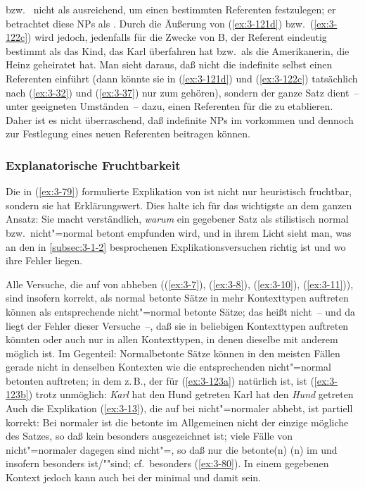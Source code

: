 \documentclass[output=paper]{langsci/langscibook}
\begin{document}
bzw.\  nicht als ausreichend, um einen
bestimmten Referenten festzulegen; er betrachtet diese NPs als
. Durch die Äußerung von (\ref{ex:3-121d}) bzw.\ (\ref{ex:3-122c}) wird jedoch, jedenfalls für die Zwecke von B, der Referent eindeutig bestimmt als das Kind, das Karl überfahren hat bzw.\ als die Amerikanerin, die Heinz geheiratet hat. Man sieht daraus, daß nicht
die indefinite  selbst einen Referenten einführt (dann könnte sie in (\ref{ex:3-121d}) und (\ref{ex:3-122c}) tatsächlich nach (\ref{ex:3-32}) und (\ref{ex:3-37}) nur zum 
gehören), sondern der ganze Satz dient~-- unter geeigneten Umständen~-- dazu, einen Referenten für die  zu etablieren. Daher ist es nicht überraschend, daß indefinite NPs im  vorkommen und dennoch zur Festlegung eines neuen Referenten beitragen können.

\subsubsection{Explanatorische Fruchtbarkeit}
\label{subsubsec:3-1-4-4}

Die in (\ref{ex:3-79}) formulierte Explikation von  ist nicht nur heuristisch fruchtbar, sondern sie hat Erklärungswert. Dies halte ich für das wichtigste an dem ganzen Ansatz: Sie macht verständlich, \textit{warum} ein gegebener Satz als stilistisch normal bzw.\ nicht"=normal betont empfunden wird, und in ihrem Licht sieht man, was an den in \ref{subsec:3-1-2} besprochenen Explikationsversuchen richtig ist und wo ihre Fehler liegen.

Alle Versuche, die auf  von
 abheben ((\ref{ex:3-7}), (\ref{ex:3-8}), (\ref{ex:3-10}), (\ref{ex:3-11})), sind insofern korrekt, als normal betonte Sätze in mehr Kontexttypen auftreten können als
entsprechende nicht"=normal betonte Sätze; das heißt nicht~-- und da
liegt der Fehler dieser Versuche~--, daß sie in beliebigen Kontexttypen auftreten könnten oder auch nur in allen Kontexttypen, in denen dieselbe  mit anderem  möglich ist. Im Gegenteil: Normalbetonte Sätze können in den meisten Fällen gerade nicht in denselben Kontexten wie die entsprechenden nicht"=normal betonten auftreten; in dem  z.\,B., der für (\ref{ex:3-123a}) natürlich ist, ist (\ref{ex:3-123b}) trotz  unmöglich:
\eal
\label{ex:3-123}
\ex
\label{ex:3-123a}
\textit{Karl} hat den Hund getreten
\ex
\label{ex:3-123b}
Karl hat den \textit{Hund} getreten
\zl
Auch die Explikation (\ref{ex:3-13}), die auf  bei
nicht"=normaler  abhebt, ist partiell korrekt: Bei normaler
 ist die betonte  im Allgemeinen nicht der einzige
mögliche  des Satzes, so daß kein  besonders ausgezeichnet
ist; viele Fälle von nicht"=normaler  dagegen sind
nicht"=, so daß nur die betonte(n) (n) im
 und insofern besonders  ist/""sind;
cf.\ besonders (\ref{ex:3-80}). In einem gegebenen Kontext jedoch kann auch bei
 der  minimal und damit 
sein.
\end{document}
